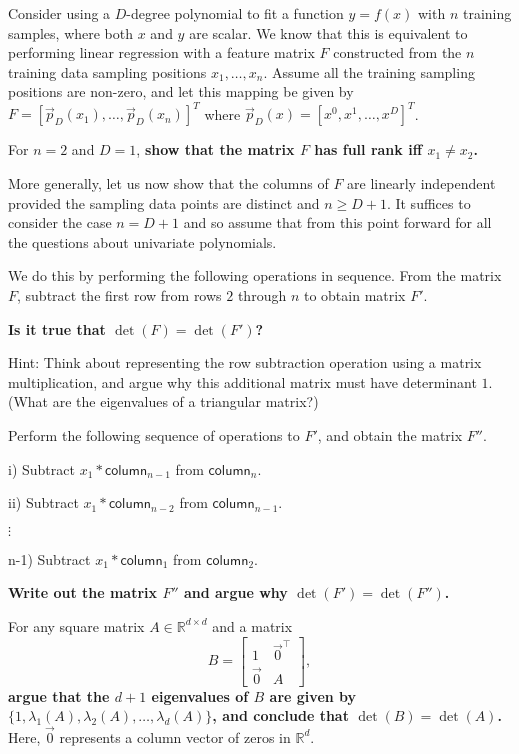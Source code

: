 Consider using a $D$-degree polynomial to fit a function $y = f(x)$ with $n$ training samples, where both $x$ and $y$ are scalar. We know that this is equivalent to performing linear regression with a feature matrix $F$ constructed from the $n$ training data sampling positions $x_1, \ldots, x_n$. Assume all the training sampling positions are non-zero, and let this mapping be given by $F = [\vec{p}_D(x_1), \ldots , \vec{p}_D(x_n)]^T$ where $\vec{p}_D(x)=[x^{0},x^{1},\ldots ,x^D]^T$.   
\begin{Parts}

\Part For $n = 2$ and $D=1$, {\bf show that the matrix $F$ has full rank iff $x_1 \neq x_2$.}

\Part More generally, let us now show that the columns of $F$ are linearly independent provided the sampling data points are distinct and $n \geq D+1$. It suffices to consider the case $n=D+1$ and so assume that from this point forward for all the questions about univariate polynomials. 

We do this by performing the following operations in sequence. From the matrix $F$, subtract the first row from rows $2$ through $n$ to obtain matrix $F'$. 

{\bf Is it true that $\det(F) = \det(F')$?} 

Hint: Think about representing the row subtraction operation using a matrix multiplication, and argue why this additional matrix must have determinant $1$. (What are the eigenvalues of a triangular matrix?)

\Part Perform the following sequence of operations to $F'$, and obtain the matrix $F''$.

i) Subtract $x_1 * \mathsf{column}_{n-1}$ from $\mathsf{column}_{n}$.  

ii) Subtract $x_1 * \mathsf{column}_{n-2}$ from $\mathsf{column}_{n-1}$.

$\vdots$

n-1) Subtract $x_1 * \mathsf{column}_{1}$ from $\mathsf{column}_{2}$.

{\bf Write out the matrix $F''$ and argue why $\det(F') = \det(F'')$.}

\Part For any square matrix $A \in \mathbb{R}^{d \times d}$ and a matrix
$$
B = 
\begin{bmatrix}
1 & {\vec 0}^\top \\
{\vec 0} & A 
\end{bmatrix},
 $$
{\bf argue that the $d+1$ eigenvalues of $B$ are given by $\{1, \lambda_1(A), \lambda_2(A), \ldots, \lambda_d(A)\}$, and conclude that $\det(B) = \det(A)$.} Here, ${\vec 0}$ represents a column vector of zeros in $\mathbb{R}^d$.


\end{Parts}
